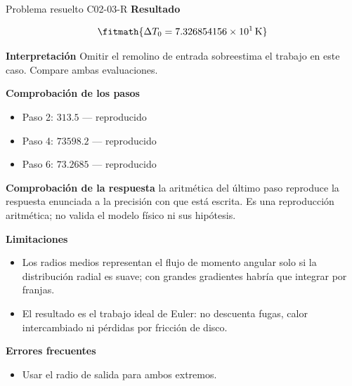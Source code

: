 \documentclass[10pt,openany]{book}
\begin{document}
\begin{studiumworked}{Problema resuelto C02-03-R}
\noindent\textbf{Resultado}

\[
\fitmath{\Delta T_0=7.326854156\times10^{1}\,\mathrm{K}}
\]

\noindent\textbf{Interpretación}
Omitir el remolino de entrada sobreestima el trabajo en este caso. Compare ambas evaluaciones.

\noindent\textbf{Comprobación de los pasos}
\begin{itemize}
\item Paso 2: $313.5$ — reproducido
\item Paso 4: $73598.2$ — reproducido
\item Paso 6: $73.2685$ — reproducido
\end{itemize}

\noindent\textbf{Comprobación de la respuesta} la aritmética del último paso reproduce la respuesta enunciada a la precisión con que está escrita. Es una reproducción aritmética; no valida el modelo físico ni sus hipótesis.

\noindent\textbf{Limitaciones}
\begin{itemize}
\item Los radios medios representan el flujo de momento angular solo si la distribución radial es suave; con grandes gradientes habría que integrar por franjas.
\item El resultado es el trabajo ideal de Euler: no descuenta fugas, calor intercambiado ni pérdidas por fricción de disco.
\end{itemize}

\noindent\textbf{Errores frecuentes}
\begin{itemize}
\item Usar el radio de salida para ambos extremos.
\end{itemize}
\end{studiumworked}
\end{document}
